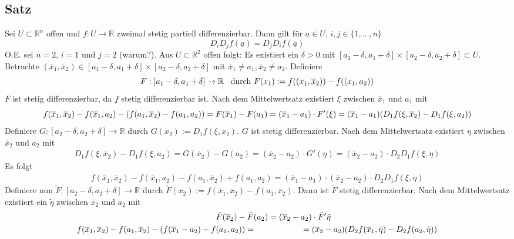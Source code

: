 \subsection[Satz über Reihenfolge des Differenzierens]{Satz} %
\label{sub:66}
Sei $U \subset \mathds{R}^n$ offen und $f : U \to \mathds{R}$ zweimal stetig partiell differenzierbar. Dann gilt für $\underline{a} \in U $, $i,j \in \{1, \ldots ,n\}$
\[
	D_i D_j f (\underline{a}) =  D_j D_i f(\underline{a})
\]
O.E. sei $n=2$, $i=1$ und $j=2$ (warum?). Aus $U \subset \mathds{R}^2$ offen folgt: Es existiert ein $\delta >0$ mit 
$[a_1 - \delta , a_1 + \delta ] \times [a_2 - \delta , a_2 + \delta ] \subset U$. Betrachte $(\overline{x}_1, \overline{x}_2) \in  [a_1 - \delta , a_1 + \delta ] \times 
[a_2 - \delta , a_2 + \delta ] $ mit $\overline{x}_1 \not=a_1 , \overline{x}_2 \not= a_2$. Definiere
\[
	F: [a_1 - \delta , a_1 + \delta ] \to \mathds{R} \enspace \text{ durch } F(x_1) := f \enbrace*{ (x_1, \overline{x}_2 )} - f \enbrace*{(x_1, a_2)}  
\]
$F$ ist stetig differenzierbar, da $f$ stetig differenzierbar ist. Nach dem Mittelwertsatz existiert $\xi$ zwischen $\overline{x}_1 $ und $a_1$ mit 
\[
	 f(\overline{x}_1, \overline{x}_2 ) - f(\overline{x}_1, a_2 ) - \enbrace*{ f(a_1, \overline{x}_2 ) - f (a_1, a_2)} = F(\overline{x}_1 ) - F(a_1) = 
	 (\overline{x}_1 - a_1 ) \cdot F'(\xi) = (\overline{x}_1 - a_1 ) ( D_1 f(\xi, \overline{x}_2 ) - D_1 f(\xi, a_2) )
\]
Definiere $G : [a_2 - \delta , a_2 + \delta ] \to \mathds{R}$ durch $G(x_2) := D_1 f (\xi, x_2)$. $G$ ist stetig differenzierbar. Nach dem Mittelwertsatz existiert
$\eta$ zwischen $\overline{x}_2 $ und $a_2$ mit 
\begin{gather*}
	D_1 f(\xi, \overline{x}_2 ) - D_1 f(\xi, a_2) = G(\overline{x}_2 ) - G(a_2) = (\overline{x}_2 - a_2 ) \cdot G'(\eta) = (\overline{x}_2 - a_2) \cdot D_2 D_1 f(\xi, \eta)
\end{gather*}
Es folgt 
\begin{align*}
	f(\overline{x}_1, \overline{x}_2 ) - f(\overline{x}_1, a_2 ) - f(a_1, \overline{x}_2 ) + f(a_1, a_2) = (\overline{x}_1 - a_1 ) \cdot ( \overline{x}_2 - a_2 ) \cdot  
	D_2 D_1 f(\xi, \eta) \tag{$\star$}
\end{align*}
Definiere nun $\tilde F : [a_2 - \delta , a_2 + \delta ] \to \mathds{R}$ durch $\tilde F (x_2) := f (\overline{x}_1, x_2 ) - f(a_1, x_2)$. Dann ist $\tilde F$ stetig 
differenzierbar. Nach dem Mittelwertsatz existiert ein $\tilde \eta$ zwischen $\overline{x}_2 $ und $a_2$ mit 
\begin{gather*}
	\qquad \qquad \tilde F (\overline{x}_2 ) - \tilde F (a_2) = (\overline{x}_2 -a_2 ) \cdot \tilde F'{\tilde \eta} \\
	f(\overline{x}_1 , \overline{x}_2  ) - f(a_1, \overline{x}_2 ) - \enbrace*{ f(\overline{x}_1 - a_2 ) - f(a_1, a_2)} =\qquad \qquad \qquad 
	= (\overline{x}_2 - a_2 ) (D_2 f(\overline{x}_1, \tilde \eta ) - D_2 f(a_2, \tilde \eta))
\end{gather*}
